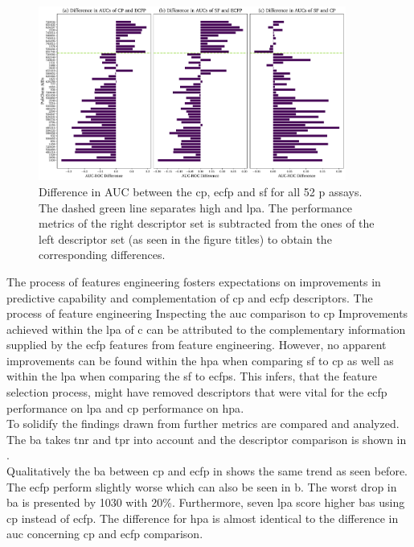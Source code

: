 \begin{figure}[H]
	\centering
	\includegraphics[width=0.9\textwidth]{figures/AUCComparison.pdf}
	\caption[Difference in AUC Between the \ac{cp}, \ac{ecfp} and \acl{sf}]{Difference in AUC between the \ac{cp}, \ac{ecfp} and \acl{sf} for all 52 \acl{p} assays. The dashed green line separates high and \acl{lpa}. The performance metrics of the right descriptor set is subtracted from the ones of the left descriptor set (as seen in the figure titles) to obtain the corresponding differences.}
	\label{fig:diffauc}
\end{figure}\noindent
The process of features engineering fosters expectations on improvements in predictive capability and complementation of \ac{cp} and \ac{ecfp} descriptors. The process of feature engineering Inspecting the \ac{auc} comparison to \ac{cp} Improvements achieved within the \acl{lpa} of c can be attributed to the complementary information supplied by the \ac{ecfp} features from feature engineering. However, no apparent improvements can be found within the \acl{hpa} when comparing \acl{sf} to \ac{cp} as well as within the \acl{lpa} when comparing the \acl{sf} to \acp{ecfp}. This infers, that the feature selection process, might have removed descriptors that were vital for the \ac{ecfp} performance on \acl{lpa} and \ac{cp} performance on \acl{hpa}.\\
To solidify the findings drawn from  further metrics are compared and analyzed. The \acl{ba} takes \ac{tnr} and \ac{tpr} into account and the descriptor comparison is shown in .\\
Qualitatively the \acl{ba} between \ac{cp} and \ac{ecfp} in  shows the same trend as seen before. The \ac{ecfp} perform slightly worse which can also be seen in b. The worst drop in \acl{ba} is presented by 1030 with 20\%. Furthermore, seven \acl{lpa} score higher \aclp{ba} using \ac{cp} instead of \ac{ecfp}. The difference for \acl{hpa} is almost identical to the difference in \ac{auc} concerning \ac{cp} and \ac{ecfp} comparison.\\
